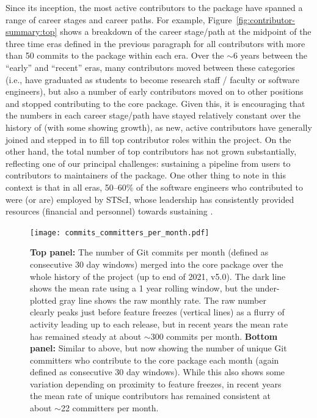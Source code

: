 \documentclass[modern]{aastex631}
\begin{document}
Since its inception, the most active contributors to the \astropypkg package
have spanned a range of career stages and career paths.
For example, Figure~\ref{fig:contributor-summary:top} shows a breakdown of the
career stage/path at the midpoint of the three time eras defined in the previous
paragraph for all contributors with more than 50 commits to the \astropypkg
package within each era.
Over the $\sim$6 years between the ``early'' and ``recent'' eras, many
contributors moved between these categories (i.e., have graduated as students to
become research staff / faculty or software engineers), but also a number of
early contributors moved on to other positions and stopped contributing to the
core \astropypkg package.
Given this, it is encouraging that the numbers in each career stage/path have
stayed relatively constant over the history of \astropy (with some showing
growth), as new, active contributors have generally joined and stepped in to
fill top contributor roles within the project.
On the other hand, the total number of top contributors has not grown
substantially, reflecting one of our principal challenges: sustaining a pipeline
from users to contributors to maintainers of the package.
One other thing to note in this context is that in all eras, 50--60\% of the
software engineers who contributed to \astropypkg were (or are) employed by
STScI, whose leadership has consistently provided resources (financial and
personnel) towards sustaining \astropypkg.

\begin{figure}[t!]
    \begin{centering}
      \texttt{[image: commits\_committers\_per\_month.pdf]}
        \caption{
            \textbf{Top panel:} The number of Git commits per month (defined as
            consecutive 30 day windows) merged into the \astropypkg core
            package over the whole history of the project (up to end of 2021,
            v5.0).
            The dark line shows the mean rate using a 1 year rolling window, but
            the under-plotted gray line shows the raw monthly rate.
            The raw number clearly peaks just before feature freezes (vertical
            lines) as a flurry of activity leading up to each release, but in
            recent years the mean rate has remained steady at about $\sim$300
            commits per month.
            \textbf{Bottom panel:} Similar to above, but now showing the number
            of unique Git committers who contribute to the \astropypkg core
            package each month (again defined as consecutive 30 day windows).
            While this also shows some variation depending on proximity to
            feature freezes, in recent years the mean rate of unique
            contributors has remained consistent at about $\sim$22 committers
            per month.
        }
        \label{fig:contributor-summary:per-month}
    \end{centering}
\end{figure}
\end{document}
